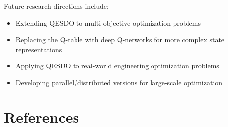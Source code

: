 \documentclass[preprint,12pt]{elsarticle}
\begin{document}
Future research directions include:
\begin{itemize}
    \item Extending QESDO to multi-objective optimization problems
    \item Replacing the Q-table with deep Q-networks for more complex state representations
    \item Applying QESDO to real-world engineering optimization problems
    \item Developing parallel/distributed versions for large-scale optimization
\end{itemize}

\section*{References}
\end{document}
